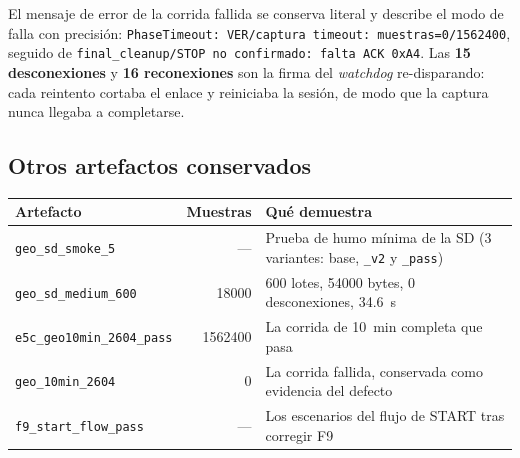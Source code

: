El mensaje de error de la corrida fallida se conserva literal y describe el modo
de falla con precisi\'on: \texttt{PhaseTimeout: VER/captura timeout:
muestras=0/1562400}, seguido de \texttt{final\_cleanup/STOP no confirmado: falta
ACK 0xA4}. Las \textbf{15 desconexiones} y \textbf{16 reconexiones} son la firma
del \emph{watchdog} re-disparando: cada reintento cortaba el enlace y reiniciaba
la sesi\'on, de modo que la captura nunca llegaba a completarse.



\subsection{Otros artefactos conservados}

\begin{center}\footnotesize
\begin{tabularx}{\textwidth}{@{}l r X@{}}
\toprule
Artefacto & Muestras & Qu\'e demuestra \\
\midrule
\texttt{geo\_sd\_smoke\_5} & --- & Prueba de humo m\'inima de la SD (3 variantes: base, \texttt{\_v2} y \texttt{\_pass}) \\
\texttt{geo\_sd\_medium\_600} & \num{18000} & 600 lotes, \SI{54000}{} bytes, 0 desconexiones, \SI{34.6}{\second} \\
\texttt{e5c\_geo10min\_2604\_pass} & \num{1562400} & La corrida de \SI{10}{\minute} completa que pasa \\
\texttt{geo\_10min\_2604} & 0 & La corrida fallida, conservada como evidencia del defecto \\
\texttt{f9\_start\_flow\_pass} & --- & Los escenarios del flujo de START tras corregir F9 \\
\bottomrule
\end{tabularx}
\end{center}

